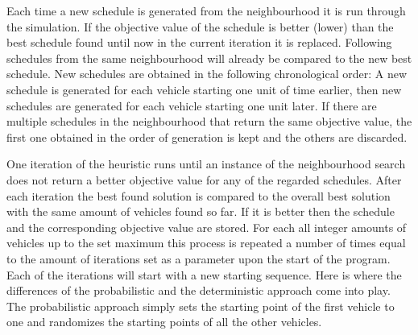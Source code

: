 Each time a new schedule is generated from the neighbourhood it is run through the simulation. If the objective value of the schedule is better
(lower) than the best schedule found until now in the current iteration it is replaced. Following schedules from the same neighbourhood will already
be compared to the new best schedule. New schedules are obtained in the following chronological order: A new schedule is generated for each vehicle
starting one unit of time earlier, then new schedules are generated for each vehicle starting one unit later. If there are multiple schedules in
the neighbourhood that return the same objective value, the first one obtained in the order of generation is kept and the others are discarded.

One iteration of the heuristic runs until an instance of the neighbourhood search does not return a better objective value for any of the regarded
schedules. After each iteration the best found solution is compared to the overall best solution with the same amount of vehicles found so far.
If it is better then the schedule and the corresponding objective value are stored. For each all integer amounts of vehicles up to the set maximum
this process is repeated a number of times equal to the amount of iterations set as a parameter upon the start of the program. Each of the iterations
will start with a new starting sequence. Here is where the differences of the probabilistic and the deterministic approach come into play. The probabilistic
approach simply sets the starting point of the first vehicle to one and randomizes the starting points of all the other vehicles. 